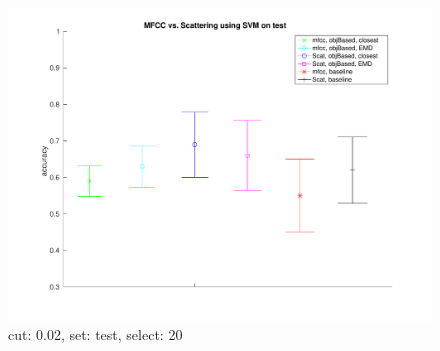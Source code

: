 \documentclass[12pt,a4paper,fleqn]{tufte-handout}
\begin{document}
\begin{center} 
\begin{figure} 
\centering 
\includegraphics[width=\textwidth,height=0.8\textheight,keepaspectratio]{./figures/Fig6.pdf} 
\caption{cut: 0.02, set: test, select: 20} 
\label{cut0.02SetteSel20} 
\end{figure} 
\end{center} 
  
  
 
 
     
     
 
\end{document}
